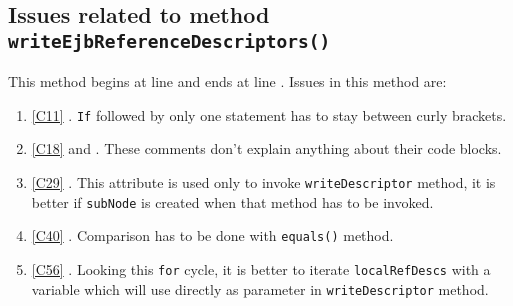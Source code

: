 \subsection{Issues related to method \texttt{writeEjbReferenceDescriptors()}}
This method begins at line  and ends at line \codeline{}. Issues in this method are:
\begin{enumerate}
\item \ref{C11} . \texttt{If} followed by only one statement has to stay between curly brackets.
\item \ref{C18}  and . These comments don't explain anything about their code blocks.
\item \ref{C29} . This attribute is used only to invoke \texttt{writeDescriptor} method, it is better if \texttt{subNode} is created when that method has to be invoked.
\item \ref{C40} . Comparison has to be done with \texttt{equals()} method.
\item \ref{C56} . Looking this \texttt{for} cycle, it is better to iterate \texttt{localRefDescs} with a variable which will use directly as parameter in \texttt{writeDescriptor} method.   
\end{enumerate}